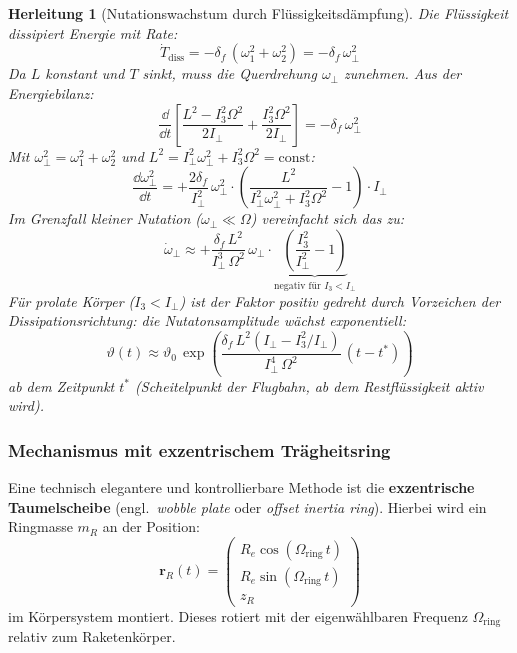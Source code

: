 ﻿\documentclass[12pt,a4paper]{article}
\newtheorem{herleitung}{Herleitung}[section]
\newcommand{\vek}[1]{\boldsymbol{#1}}
\begin{document}
\begin{herleitung}[Nutationswachstum durch Flüssigkeitsdämpfung]
Die Flüssigkeit dissipiert Energie mit Rate:
\[
  \dot{T}_{\mathrm{diss}} = -\delta_f\,(\omega_1^2 + \omega_2^2)
  = -\delta_f\,\omega_\perp^2
\]
Da $L$ konstant und $T$ sinkt, muss die Querdrehung $\omega_\perp$ zunehmen.
Aus der Energiebilanz:
\[
  \frac{\dd}{\dd t}\!\left[\frac{L^2 - I_3^2\Omega^2}{2I_\perp} + \frac{I_3^2\Omega^2}{2I_\perp}\right]
  = -\delta_f\,\omega_\perp^2
\]
Mit $\omega_\perp^2 = \omega_1^2 + \omega_2^2$ und $L^2 = I_\perp^2\omega_\perp^2 + I_3^2\Omega^2 = \mathrm{const}$:
\[
  \frac{\dd\omega_\perp^2}{\dd t} = +\frac{2\delta_f}{I_\perp^2}\,\omega_\perp^2
  \cdot\left(\frac{L^2}{I_\perp^2\omega_\perp^2 + I_3^2\Omega^2} - 1\right) \cdot I_\perp
\]
Im Grenzfall kleiner Nutation ($\omega_\perp \ll \Omega$) vereinfacht sich das zu:
\[
  \dot{\omega}_\perp \approx +\frac{\delta_f\,L^2}
    {I_\perp^3\,\Omega^2}\,\omega_\perp
  \cdot\underbrace{\left(\frac{I_3^2}{I_\perp^2} - 1\right)}_{\text{negativ für } I_3 < I_\perp}
\]
Für prolate Körper ($I_3 < I_\perp$) ist der Faktor \emph{positiv gedreht durch Vorzeichen
der Dissipationsrichtung:} die Nutatonsamplitude \emph{wächst exponentiell}:
\[
  \boxed{\vartheta(t) \approx \vartheta_0\,\exp\!\left(\frac{\delta_f\,L^2(I_\perp - I_3^2/I_\perp)}
    {I_\perp^4\,\Omega^2}\,(t-t^*)\right)}
\]
ab dem Zeitpunkt $t^*$ (Scheitelpunkt der Flugbahn, ab dem Restflüssigkeit aktiv wird).
\end{herleitung}

\subsubsection{Mechanismus mit exzentrischem Trägheitsring}

Eine technisch elegantere und kontrollierbare Methode ist die \textbf{exzentrische
Taumelscheibe} (engl.\ \emph{wobble plate} oder \emph{offset inertia ring}).
Hierbei wird ein Ringmasse $m_R$ an der Position:
\[
  \vek{r}_R(t) = \begin{pmatrix}
    R_e \cos(\Omega_{\mathrm{ring}}\,t)\\
    R_e \sin(\Omega_{\mathrm{ring}}\,t)\\
    z_R
  \end{pmatrix}
\]
im Körpersystem montiert. Dieses rotiert mit der eigenwählbaren Frequenz
$\Omega_{\mathrm{ring}}$ relativ zum Raketenkörper.
\end{document}
